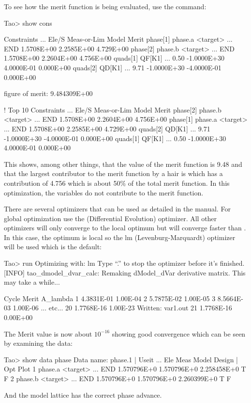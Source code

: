 \documentclass{hitec}     %
\begin{document}
{To see how the merit function is being evaluated, use the  command:
\begin{code}
Tao> show cons

Constraints                 ...  Ele/S    Meas-or-Lim    Model       Merit      
phase[1]   phase.a <target> ...  END      1.5708E+00   2.2585E+00  4.729E+00
phase[2]   phase.b <target> ...  END      1.5708E+00   2.2604E+00  4.756E+00
quads[1]   QF[K1]           ...  0.50    -1.0000E+30   4.0000E-01  0.000E+00
quads[2]   QD[K1]           ...  9.71    -1.0000E+30  -4.0000E-01  0.000E+00    

 figure of merit: 9.484309E+00

! Top 10
Constraints                 ...  Ele/S    Meas-or-Lim    Model       Merit     
phase[2]   phase.b <target> ...  END      1.5708E+00   2.2604E+00  4.756E+00
phase[1]   phase.a <target> ...  END      1.5708E+00   2.2585E+00  4.729E+00
quads[2]   QD[K1]           ...  9.71    -1.0000E+30  -4.0000E-01  0.000E+00
quads[1]   QF[K1]           ...  0.50    -1.0000E+30   4.0000E-01  0.000E+00 
\end{code}
This shows, among other things, that the value of the merit function is 9.48 and that the largest
contributor to the merit function by a hair is  which has a contribution of 4.756 which is about
50\% of the total merit function.
In this optimization, the variables do not contribute to the merit function.

There are several optimizers that can be used as detailed in the \tao manual. For global optimization use
the  (Differential Evolution) optimizer. All other optimizers will only converge to the local optimum
but will converge faster than .
In this case, the optimum is local so the lm (Levenburg-Marquardt) optimizer will be used which is the default:
\begin{code}
Tao> run
Optimizing with: lm
Type ``.'' to stop the optimizer before it's finished.
[INFO] tao_dmodel_dvar_calc:
    Remaking dModel_dVar derivative matrix.
    This may take a while...

  Cycle      Merit    A_lambda
    1    4.3831E-01   1.00E-04
    2    5.7875E-02   1.00E-05
    3    8.5664E-03   1.00E-06
    ... etc...
   20    1.7768E-16   1.00E-23
Written: var1.out
   21    1.7768E-16   0.00E+00
\end{code}
The Merit value is now about $10^{-16}$ showing good convergence which can be seen by examining the data:
\begin{code}
Tao> show data phase
Data name: phase.1
                                                                     |  Useit
                     ... Ele        Meas         Model        Design | Opt Plot
 1  phase.a <target> ... END  1.570796E+0   1.570796E+0   2.258458E+0    T    F
 2  phase.b <target> ... END  1.570796E+0   1.570796E+0   2.260399E+0    T    F
\end{code}
And the model lattice has the correct phase advance.

}
\end{document}
